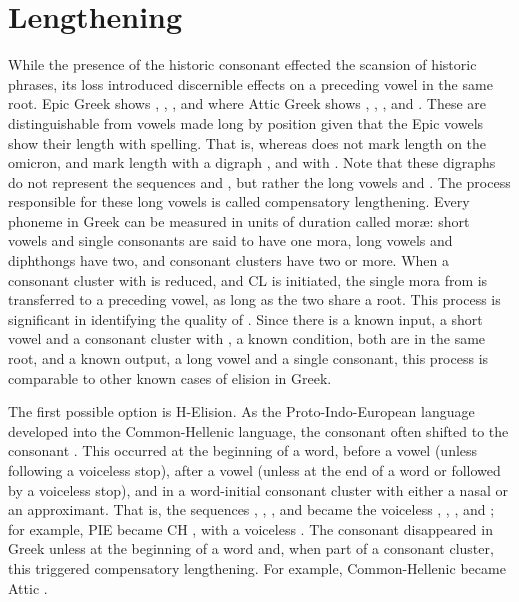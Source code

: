 \section{Lengthening}\label{sec:Lengthening}
While the presence of the historic consonant \greek{*\w} effected the scansion of historic phrases, its loss introduced discernible effects on a preceding vowel in the same root. Epic Greek shows , , , and  where Attic Greek shows , , , and . These are distinguishable from vowels made long by position given that the Epic vowels show their length with spelling. That is, whereas  does not mark length on the omicron,  and  mark length with a digraph , and  with . Note that these digraphs do not represent the sequences  and , but rather the long vowels  and . The process responsible for these long vowels is called compensatory lengthening. Every phoneme in Greek can be measured in units of duration called mor\ae: short vowels and single consonants are said to have one mora, long vowels and diphthongs have two, and consonant clusters have two or more. When a consonant cluster with \greek{*\w} is reduced, and CL is initiated, the single mora from \greek{*\w} is transferred to a preceding vowel, as long as the two share a root. This process is significant in identifying the quality of \greek{*\w}. Since there is a known input, a short vowel and a consonant cluster with \greek{*\w},  a known condition, both are in the same root, and a known output, a long vowel and a single consonant, this process is comparable to other known cases of elision in Greek.



The first possible option is H-Elision. As the Proto-Indo-European language developed into the Common-Hellenic language, the consonant  often shifted to the consonant . This occurred at the beginning of a word, before a vowel (unless following a voiceless stop), after a vowel (unless at the end of a word or followed by a voiceless stop), and in a word-initial consonant cluster with either a nasal or an approximant.\autocite[168-172]{Smyth_2013} That is, the sequences , , , and  became the voiceless , , , and ; for example, PIE  became CH , with a voiceless .\autocite[ῥυθμός]{Beekes_2009} The consonant  disappeared in Greek unless at the beginning of a word and, when part of a consonant cluster, this triggered compensatory lengthening. For example, Common-Hellenic  became Attic .\autocite[]{Beekes_2009}


